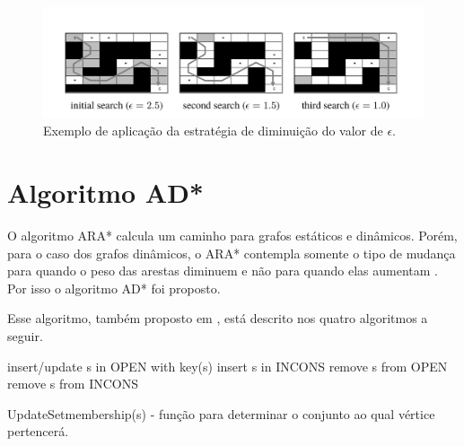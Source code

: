 \begin{figure}[H]
\centering
\includegraphics[width=.80\textwidth]{figuras/ara-3} 
\caption{Exemplo de aplicação da estratégia de diminuição do valor de $\epsilon$.}
\label{fig-ara-exemplo}
\end{figure}



\section{Algoritmo AD*}
\label{sec-dinamicos-ad}

O algoritmo ARA* calcula um caminho para grafos estáticos e dinâmicos. Porém, para o caso dos grafos dinâmicos, o ARA* contempla somente o tipo de mudança para quando o peso das arestas diminuem e não para quando elas aumentam \cite{moura2010estudo}. Por isso o algoritmo AD* foi proposto.

Esse algoritmo, também proposto em , está descrito nos quatro algoritmos a seguir.

\begin{algorithm}[H]
\SetAlgoLined
{
	{
		insert/update s in OPEN with key(s)\;
	}
	{
		{
			insert s in INCONS\;
		}
	}
}
{
	{
		remove s from OPEN\;
	}
	{
		{
			remove s from INCONS\;
		}
	}
}
\caption{UpdateSetmembership(s) - função para determinar o conjunto ao qual vértice pertencerá.}
\end{algorithm}

